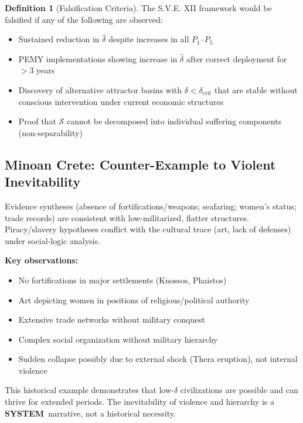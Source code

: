 \documentclass[11pt,a4paper]{article}
\newcommand{\SYSTEM}{\textbf{SYSTEM}}
\theoremstyle{definition}
\newtheorem{definition}{Definition}[section]
\theoremstyle{remark}
\begin{document}
\begin{definition}[Falsification Criteria]
The S.V.E. XII framework would be falsified if any of the following are observed:
\begin{itemize}[leftmargin=1.5em]
    \item Sustained reduction in $\hat{\delta}$ despite increases in all $P_1$--$P_5$
    \item PEMY implementations showing increase in $\hat{\delta}$ after correct deployment for $>3$ years
    \item Discovery of alternative attractor basins with $\delta < \delta_{\text{crit}}$ that are stable without conscious intervention under current economic structures
    \item Proof that $\mathcal{S}$ cannot be decomposed into individual suffering components (non-separability)
\end{itemize}
\end{definition}

\subsection{Minoan Crete: Counter-Example to Violent Inevitability}
\label{app:minoan}

Evidence syntheses (absence of fortifications/weapons; seafaring; women's status; trade records) are consistent with low-militarized, flatter structures. Piracy/slavery hypotheses conflict with the cultural trace (art, lack of defenses) under social-logic analysis.

\textbf{Key observations:}
\begin{itemize}[leftmargin=1.5em]
    \item No fortifications in major settlements (Knossos, Phaistos)
    \item Art depicting women in positions of religious/political authority
    \item Extensive trade networks without military conquest
    \item Complex social organization without military hierarchy
    \item Sudden collapse possibly due to external shock (Thera eruption), not internal violence
\end{itemize}

This historical example demonstrates that low-$\delta$ civilizations are possible and can thrive for extended periods. The inevitability of violence and hierarchy is a \SYSTEM\ narrative, not a historical necessity.
\end{document}
